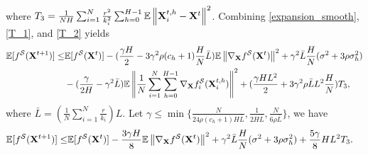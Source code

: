 \documentclass{article} %
\theoremstyle{plain}
\theoremstyle{definition}
\begin{document}
where $T_3 = \frac{1}{NH} \sum_{i=1}^{N} \frac{r^2}{k_i^2} \sum_{h=0}^{H-1} \mathbb{E} \left \|{\bf X}_i^{t,h} -{\bf X}^t
    \right \|^2$.
Combining \eqref{expansion_smooth}, \eqref{T_1}, and \eqref{T_2} yields
\begin{align}
   \mathbb{E} [f^{\mathcal{S}}({\bf X}^{t+1})] \leq & \mathbb{E}[f^{\mathcal{S}}({\bf X}^t)]   - (\frac{\gamma H}{2} - 3\gamma^2 \rho (c_h+1) \frac{H}{N}\bar{L} ) \mathbb{E} \left\| \nabla_{\bf X} f^{\mathcal{S}} ({\bf X}^t) \right\|^2 + \gamma^2 \bar{L} \frac{H}{N} (\sigma^2 + 3\rho \sigma_h^2)
    \nonumber\\
    & - (\frac{\gamma}{2H} -  \gamma^2 \bar{L} ) \mathbb{E} \left\| \frac{1}{N} \sum_{i=1}^{N} \sum_{h=0}^{H-1} \nabla_{\bf X} f_i^{\mathcal{S}} ({\bf X}_i^{t,h}) \right\|^2 
   + (\frac{\gamma H L^2}{2} +  3 \gamma^2 \rho \bar{L} L^2 \frac{H}{N} ) T_3, \nonumber
\end{align}
where \(\bar{L} = \left( \frac{1}{N} \sum_{i=1}^N \frac{r}{k_i} \right) L \).
Let $\gamma \leq \min \{\frac{N}{24 \rho (c_h + 1) H\bar{L}}, \frac{1}{2H\bar{L}}, \frac{N}{6\rho \bar{L}} \}$, we have
\begin{align}\label{T_1_T_2}
   \mathbb{E} [f^{\mathcal{S}}({\bf X}^{t+1})] \leq & \mathbb{E}[f^{\mathcal{S}}({\bf X}^t)]   - \frac{3\gamma H}{8} \mathbb{E} \left\| \nabla_{\bf X} f^{\mathcal{S}} ({\bf X}^t) \right\|^2 + \gamma^2 \bar{L} \frac{H}{N} (\sigma^2 + 3\rho \sigma_h^2)
   + \frac{5\gamma}{8} H L^2 T_3.
\end{align}
\end{document}
